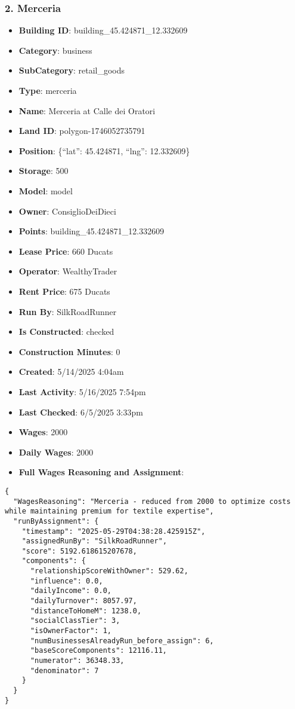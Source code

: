 \documentclass[11pt,a4paper]{article}
\begin{document}
\subsubsection{2. Merceria}

\begin{itemize}
\item \textbf{Building ID}: building\_45.424871\_12.332609
\item \textbf{Category}: business
\item \textbf{SubCategory}: retail\_goods
\item \textbf{Type}: merceria
\item \textbf{Name}: Merceria at Calle dei Oratori
\item \textbf{Land ID}: polygon-1746052735791
\item \textbf{Position}: \{``lat'': 45.424871, ``lng'': 12.332609\}
\item \textbf{Storage}: 500
\item \textbf{Model}: model
\item \textbf{Owner}: ConsiglioDeiDieci
\item \textbf{Points}: building\_45.424871\_12.332609
\item \textbf{Lease Price}: 660 Ducats
\item \textbf{Operator}: WealthyTrader
\item \textbf{Rent Price}: 675 Ducats
\item \textbf{Run By}: SilkRoadRunner
\item \textbf{Is Constructed}: checked
\item \textbf{Construction Minutes}: 0
\item \textbf{Created}: 5/14/2025 4:04am
\item \textbf{Last Activity}: 5/16/2025 7:54pm
\item \textbf{Last Checked}: 6/5/2025 3:33pm
\item \textbf{Wages}: 2000
\item \textbf{Daily Wages}: 2000
\item \textbf{Full Wages Reasoning and Assignment}:
\end{itemize}

\begin{lstlisting}
{
  "WagesReasoning": "Merceria - reduced from 2000 to optimize costs while maintaining premium for textile expertise",
  "runByAssignment": {
    "timestamp": "2025-05-29T04:38:28.425915Z",
    "assignedRunBy": "SilkRoadRunner",
    "score": 5192.618615207678,
    "components": {
      "relationshipScoreWithOwner": 529.62,
      "influence": 0.0,
      "dailyIncome": 0.0,
      "dailyTurnover": 8057.97,
      "distanceToHomeM": 1238.0,
      "socialClassTier": 3,
      "isOwnerFactor": 1,
      "numBusinessesAlreadyRun_before_assign": 6,
      "baseScoreComponents": 12116.11,
      "numerator": 36348.33,
      "denominator": 7
    }
  }
}
\end{lstlisting}
\end{document}
